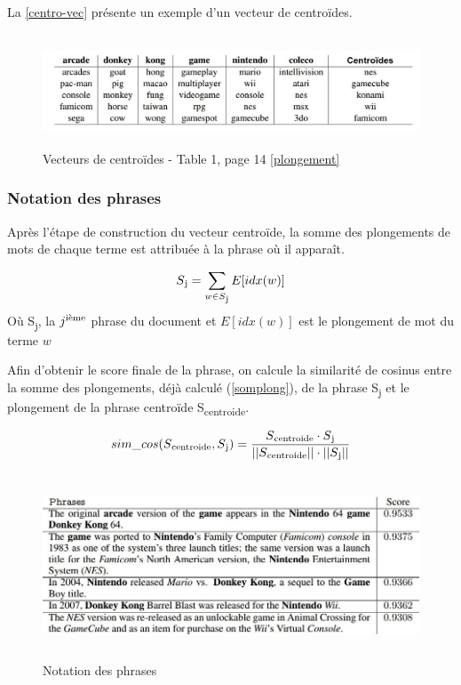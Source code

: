              La \autoref{centro-vec} présente un exemple d'un vecteur de centroïdes. 
              \begin{figure}[H]
                 \centering
                \includegraphics[height=95pt,width=420pt]{img/chapter3/centroideembed.jpg}
                \caption{Vecteurs de centroïdes - Table 1, page 14 \ref{plongement}}
                \label{centro-vec}
             \end{figure}

         \subsubsection{Notation des phrases}
         Après l'étape de construction du vecteur centroïde, la somme des plongements de mots de chaque terme  est attribuée à la phrase où il apparaît.\label{somplong}

        \begin{equation*}
         S\textsubscript{j} = \sum_{\substack{w\in S\textsubscript{j}}}
         E[idx(w)]
        \end{equation*}
        Où S\textsubscript{j}, la $j\textsuperscript{ième}$ phrase du document et $E[idx(w)]$ est le plongement de mot du terme $w$

        Afin d'obtenir le score finale de la phrase, on calcule la similarité de cosinus entre la somme des plongements, déjà calculé (\ref{somplong}), de la phrase S\textsubscript{j} et le plongement de la phrase centroïde S\textsubscript{centroide}.
        
        \[sim\_cos(S\textsubscript{centroide},S\textsubscript{j}) = \frac {S\textsubscript{centroide} \cdot S\textsubscript{j}}{||S\textsubscript{centroide}|| \cdot ||S\textsubscript{j}||}\]

            \begin{figure}[H]
                \centering
                \includegraphics[height=155pt,width=400pt]{img/chapter3/scoreembed.jpg}
                \caption{Notation des phrases}
                \label{Notation des phrases - Table 2, page 14 \ref{plongement}}
            \end{figure}

